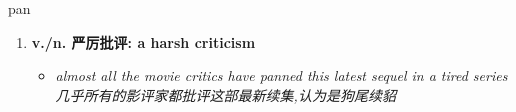 
\begin{frame}
{\huge pan}
\begin{center}
\begin{enumerate}\Large
  \item \textbf{v./n. 严厉批评: a harsh criticism}
  \begin{itemize}
    \item \em{\Large{almost all the movie critics have panned this latest sequel in a tired series 几乎所有的影评家都批评这部最新续集,认为是狗尾续貂}}
  \end{itemize}
\end{enumerate}
\end{center}
\end{frame}
